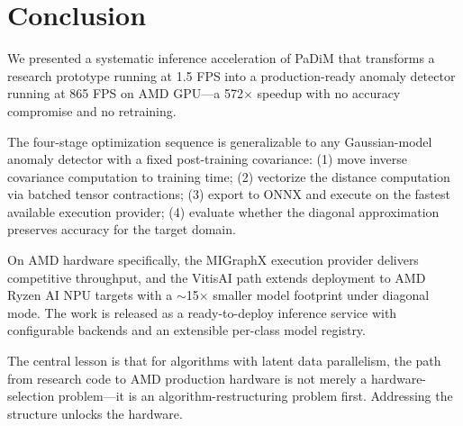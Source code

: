 \documentclass[blind]{gtac}
\begin{document}
\section{Conclusion}
\label{sec:conclusion}

We presented a systematic inference acceleration of PaDiM that transforms a
research prototype running at 1.5 FPS into a production-ready anomaly detector
running at 865 FPS on AMD GPU---a 572$\times$ speedup with no accuracy
compromise and no retraining.

The four-stage optimization sequence is generalizable to any Gaussian-model
anomaly detector with a fixed post-training covariance: (1) move inverse
covariance computation to training time; (2) vectorize the distance computation via batched tensor contractions; (3) export to ONNX and execute
on the fastest available execution provider; (4) evaluate whether the diagonal
approximation preserves accuracy for the target domain.

On AMD hardware specifically, the MIGraphX execution provider delivers
competitive throughput, and the VitisAI path extends deployment to AMD Ryzen AI
NPU targets with a $\sim$15$\times$ smaller model footprint under diagonal mode.
The work is released as a ready-to-deploy inference service with configurable
backends and an extensible per-class model registry.

The central lesson is that for algorithms with latent data parallelism, the
path from research code to AMD production hardware is not merely a
hardware-selection problem---it is an algorithm-restructuring problem first.
Addressing the structure unlocks the hardware.

\begingroup
\let\itshape\upshape


\endgroup
\end{document}

